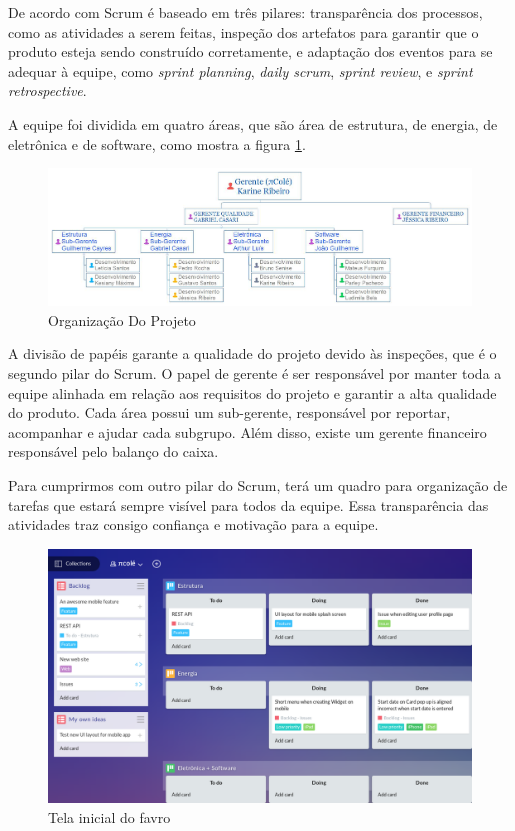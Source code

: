 De acordo com \cite{the_scrum_guide} Scrum é baseado em três pilares: transparência dos processos, como as atividades a serem feitas, inspeção dos artefatos para garantir que o produto esteja sendo construído corretamente, e adaptação dos eventos para se adequar à equipe, como \textit{sprint planning}, \textit{daily scrum}, \textit{sprint review}, e \textit{sprint retrospective}.

A equipe foi dividida em quatro áreas, que são área de estrutura, de energia, de eletrônica e de software, como mostra a figura \ref{fig:organograma}.

\begin{figure}[H]
	\centering
    \includegraphics[scale=0.3]{figuras/organograma}
    \caption{Organização Do Projeto}
    \label{fig:organograma}
\end{figure}

A divisão de papéis garante a qualidade do projeto devido às inspeções, que é o segundo pilar do Scrum. O papel de gerente é ser responsável por manter toda a equipe alinhada em relação aos requisitos do projeto e garantir a alta qualidade do produto. Cada área possui um sub-gerente, responsável por reportar, acompanhar e ajudar cada subgrupo. Além disso, existe um gerente financeiro responsável pelo balanço do caixa.

Para cumprirmos com outro pilar do Scrum, terá um quadro para organização de tarefas que estará sempre visível para todos da equipe. Essa transparência das atividades traz consigo confiança e motivação para a equipe.

\begin{figure}[H]
	\centering
    \includegraphics[scale=0.5]{figuras/favro}
    \caption{Tela inicial do favro}
    \label{fig:favro}
\end{figure}

